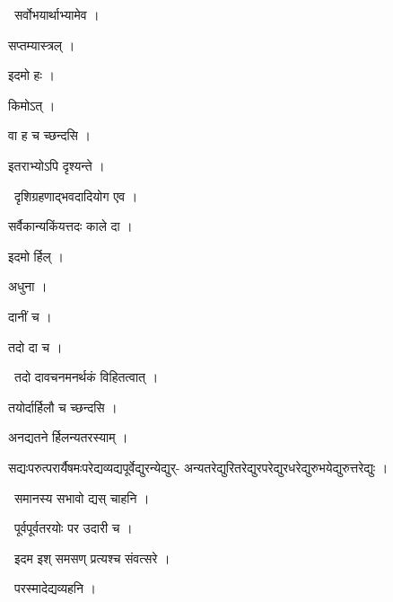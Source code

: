 \documentclass[10pt, openany, oneside]{book}
\begin{document}
\par\noindent\hspace{1.5em}{\vps वा॰}~{\qt सर्वोभयार्थाभ्यामेव ।}

\noindent सप्तम्यास्त्रल् ।

\noindent इदमो हः ।

\noindent किमोऽत् ।

\noindent वा ह च च्छन्दसि ।

\noindent इतराभ्योऽपि दृश्यन्ते ।

\par\noindent\hspace{1.5em}{\vps वा॰}~{\qt दृशिग्रहणाद्भवदादियोग एव ।}

\noindent सर्वैकान्यकिंयत्तदः काले दा ।

\noindent इदमो र्हिल् ।

\noindent अधुना ।

\noindent दानीं च ।

\noindent तदो दा च ।

\par\noindent\hspace{1.5em}{\vps वा॰}~{\qt तदो दावचनमनर्थकं विहितत्वात् ।}

\noindent तयोर्दार्हिलौ च च्छन्दसि ।

\noindent अनद्यतने र्हिलन्यतरस्याम् ।

\noindent सद्यःपरुत्परार्यैषमःपरेद्यव्यद्यपूर्वेद्युरन्येद्युर्- अन्यतरेद्युरितरेद्युरपरेद्युरधरेद्युरुभयेद्युरुत्तरेद्युः ।

\par\noindent\hspace{1.5em}{\vps वा॰}~{\qt समानस्य सभावो द्यस् चाहनि ।}

\par\noindent\hspace{1.5em}{\vps वा॰}~{\qt पूर्वपूर्वतरयोः पर उदारी च ।}

\par\noindent\hspace{1.5em}{\vps वा॰}~{\qt इदम इश् समसण् प्रत्यश्च संवत्सरे ।}

\par\noindent\hspace{1.5em}{\vps वा॰}~{\qt परस्मादेद्यव्यहनि ।}
\end{document}
